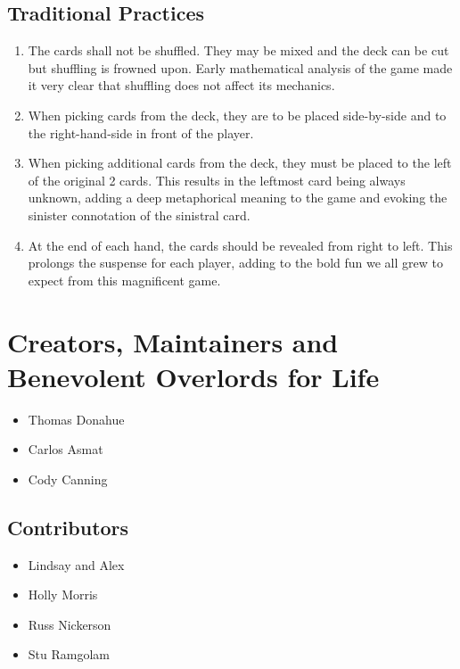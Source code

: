 \documentclass[11pt]{article}
\begin{document}
\subsection{Traditional Practices}
\label{sec-3-1}

\begin{enumerate}
\item The cards shall not be shuffled. They may be mixed and the deck can be cut
   but shuffling is frowned upon. Early mathematical analysis of the game made
   it very clear that shuffling does not affect its mechanics.
\item When picking cards from the deck, they are to be placed side-by-side and to
   the right-hand-side in front of the player.
\item When picking additional cards from the deck, they must be placed to the left
   of the original 2 cards. This results in the leftmost card being always
   unknown, adding a deep metaphorical meaning to the game and evoking the
   sinister connotation of the sinistral card.
\item At the end of each hand, the cards should be revealed from right to left.
   This prolongs the suspense for each player, adding to the bold fun we all
   grew to expect from this magnificent game.
\end{enumerate}
\section{Creators, Maintainers and Benevolent Overlords for Life}
\label{sec-4}

\begin{itemize}
\item Thomas Donahue
\item Carlos Asmat
\item Cody Canning
\end{itemize}
\subsection{Contributors}
\label{sec-4-1}

\begin{itemize}
\item Lindsay and Alex
\item Holly Morris
\item Russ Nickerson
\item Stu Ramgolam
\end{itemize}
  
\end{document}
